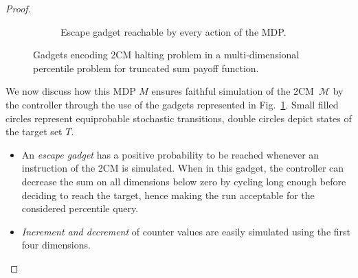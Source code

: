 \documentclass{llncs}
\newcommand{\markovProcess}{\ensuremath{{M} }}
\newcommand{\truncatedTarget}{\ensuremath{T} }
\newcommand{\twoCM}{\ensuremath{\mathcal{M}} }
\begin{document}
\begin{proof}
\begin{figure}[tb]
\begin{subfigure}[b]{1\textwidth}
        \centering
                \caption{Escape gadget reachable by every action of the MDP.}
        \end{subfigure}
        \caption{Gadgets encoding 2CM halting problem in a multi-dimensional percentile problem for truncated sum payoff function.}\label{fig:sp_undec_gadgets}    
\end{figure}


We now discuss how this MDP $\markovProcess$ ensures faithful simulation of the 2CM~$\twoCM$ by the controller through the use of the gadgets represented in Fig.~\ref{fig:sp_undec_gadgets}. Small filled circles represent equiprobable stochastic transitions, double circles depict states of the target set $\truncatedTarget$.
\begin{itemize}
\item An \textit{escape gadget} has a positive probability to be reached whenever an instruction of the 2CM is simulated. When in this gadget, the controller can decrease the sum on all dimensions below zero by cycling long enough before deciding to reach the target, hence making the run acceptable for the considered percentile query.

\item \textit{Increment and decrement} of counter values are easily simulated using the first four dimensions.


\end{itemize}
\end{proof}
\end{document}
